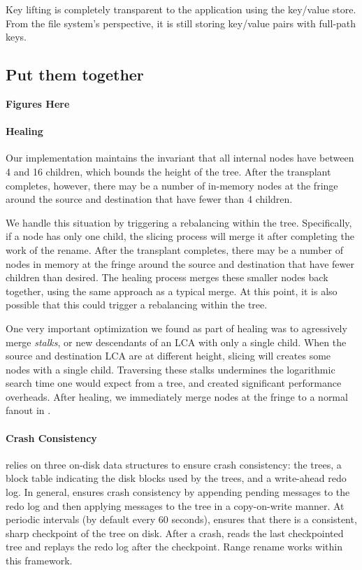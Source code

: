 Key lifting is completely transparent to the application using the key/value
store.
From the file system's perspective, it is still storing key/value pairs with
full-path keys.

\subsection{Put them together}

\textbf{Figures Here}


\paragraph{Healing}  Our \bet implementation maintains the
invariant that all internal nodes have between 4 and 16 children,
which bounds the height of the tree.  After the transplant completes,
however, there may be a number of in-memory \bet nodes at the fringe
around the source and destination that have fewer than 4 children.

We handle this situation by triggering a rebalancing within the tree.
Specifically, if a node has only one child, the slicing process will merge
it after completing the work of the rename.
After the transplant completes, there may be a number
of \bet nodes in memory at the fringe around the
source and destination that have fewer children than desired.
The healing process merges these smaller nodes back together,
using the same approach as a typical \bet merge.  At this point, it is also
possible that this could trigger a rebalancing within the tree.

One very important optimization we found as part of healing was to
agressively merge {\em stalks}, or new descendants of an LCA with
only a single child.
When the source and destination LCA are at different height, slicing
will creates some nodes with a single child.
Traversing these stalks undermines the logarithmic search time one would
expect from a tree, and created significant performance overheads.
After healing, we immediately merge nodes at the fringe
to a normal fanout in \bet.

\paragraph{Crash Consistency} \betrfs relies on three on-disk data structures to
ensure crash consistency: the trees, a block table indicating the disk blocks
used by the trees, and a write-ahead redo log. In general, \betrfs ensures crash
consistency by appending pending messages to the redo log and then applying
messages to the tree in a copy-on-write manner.
At periodic intervals (by default every 60 seconds), \betrfs ensures that there
is a consistent, sharp checkpoint of the tree on disk.
After a crash, \betrfs reads the last checkpointed tree and replays the redo log
after the checkpoint.
Range rename works within this framework.

